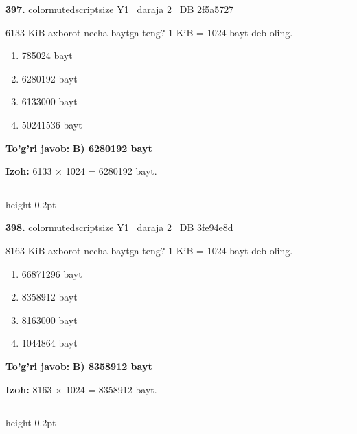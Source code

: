 \documentclass[10pt,a4paper,oneside]{article}
\begin{document}
\noindent\textbf{\color{ink}397.}  {color{muted}scriptsize Y1 \textbullet\ daraja 2 \textbullet\ DB 2f5a5727}
\par
6133 KiB axborot necha baytga teng? 1 KiB = 1024 bayt deb oling.
\begin{enumerate}[label=\Alph*),leftmargin=9mm]
\item 785024 bayt
\item 6280192 bayt
\item 6133000 bayt
\item 50241536 bayt
\end{enumerate}
\begin{tcolorbox}[enhanced,breakable,colback=teal!4,colframe=teal!50!black,boxrule=0.5pt,arc=1.1mm,left=3mm,right=3mm,top=1.7mm,bottom=1.7mm,before skip=2mm,after skip=2mm]
\textbf{\color{teal}To'g'ri javob:} \textbf{B) 6280192 bayt}
\par\smallskip
\textbf{Izoh:} 6133 \ensuremath{\times} 1024 = 6280192 bayt.
\end{tcolorbox}
\vspace{2mm}\hrule height 0.2pt \vspace{3mm}

\noindent\textbf{\color{ink}398.}  {color{muted}scriptsize Y1 \textbullet\ daraja 2 \textbullet\ DB 3fe94e8d}
\par
8163 KiB axborot necha baytga teng? 1 KiB = 1024 bayt deb oling.
\begin{enumerate}[label=\Alph*),leftmargin=9mm]
\item 66871296 bayt
\item 8358912 bayt
\item 8163000 bayt
\item 1044864 bayt
\end{enumerate}
\begin{tcolorbox}[enhanced,breakable,colback=teal!4,colframe=teal!50!black,boxrule=0.5pt,arc=1.1mm,left=3mm,right=3mm,top=1.7mm,bottom=1.7mm,before skip=2mm,after skip=2mm]
\textbf{\color{teal}To'g'ri javob:} \textbf{B) 8358912 bayt}
\par\smallskip
\textbf{Izoh:} 8163 \ensuremath{\times} 1024 = 8358912 bayt.
\end{tcolorbox}
\vspace{2mm}\hrule height 0.2pt \vspace{3mm}
\end{document}
